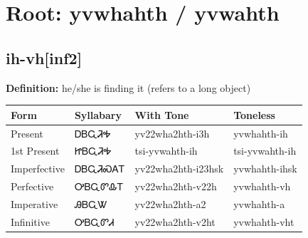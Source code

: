 \documentclass{article}%
\begin{document}
%
\normalsize%
\section*{Root: yvwhahth / yvwahth}%
\subsection*{ih-vh[inf2]}%
\textbf{Definition: }%
he/she is finding it (refers to a long object)%
\\[0.5em]%
\begin{tabular}{|l|l|l|l|}%
\hline%
\textbf{Form}&\textbf{Syllabary}&\textbf{With Tone}&\textbf{Toneless}\\%
\hline%
Present&ᎠᏴᏩᏘᎭ&yv22wha2hth{-}i3h&yvwhahth{-}ih\\%
1st Present&ᏥᏴᏩᏘᎭ&tsi{-}yvwahth{-}ih&tsi{-}yvwahth{-}ih\\%
Imperfective&ᎠᏴᏩᏘᏍᎪᎢ&yv22wha2hth{-}i23hsk&yvwhahth{-}ihsk\\%
Perfective&ᎤᏴᏩᏛᎲᎢ&yv22wha2hth{-}v22h&yvwhahth{-}vh\\%
Imperative&ᎯᏴᏩᏔ&yv22wha2hth{-}a2&yvwhahth{-}a\\%
Infinitive&ᎤᏴᏩᏛᏗ&yv22wha2hth{-}v2ht&yvwhahth{-}vht\\%
\hline%
\end{tabular}%
\\[1em]%
\end{document}
